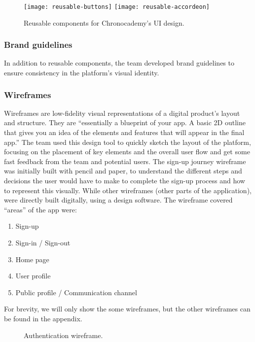 \begin{figure}[h]
    \centering
    \texttt{[image: reusable-buttons]}
    \texttt{[image: reusable-accordeon]}
    \caption{Reusable components for Chronocademy's UI design.}\label{fig:figure7}
\end{figure}

\subsubsection{Brand guidelines}\label{subsubsec:brand-guidelines}
In addition to reusable components, the team developed brand guidelines to ensure consistency in the platform's visual identity.
\newpage

\newpage
\subsubsection{Wireframes}\label{subsubsec:wireframes}
Wireframes are low-fidelity visual representations of a digital product's layout and structure.
They are ``essentially a blueprint of your app.
A basic 2D outline that gives you an idea of the elements and features that will appear in the final app.''\cite[Wireframes]{wireframe}
The team used this design tool to quickly sketch the layout of the platform, focusing on the placement of key elements and the overall user flow and get some fast feedback from the team and potential users.\newline\newline
The sign-up journey wireframe was initially built with pencil and paper, to understand the different steps and decisions the user would have to make to complete the sign-up process and how to represent this visually.
While other wireframes (other parts of the application), were directly built digitally, using a design software.
The wireframe covered ``areas'' of the app were:
\begin{enumerate}
    \item Sign-up
    \item Sign-in / Sign-out
    \item Home page
    \item User profile
    \item Public profile / Communication channel
\end{enumerate}
For brevity, we will only show the some wireframes, but the other wireframes can be found in the appendix.\newline
\begin{figure}[h]
    \centering
    \caption{Authentication wireframe.}
    \label{fig:figure9}
\end{figure}
